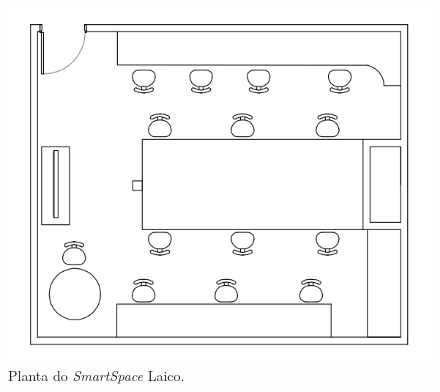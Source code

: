 	\begin{figure}[hbt]
			\begin{center}
				\includegraphics[scale=0.6]{figuras/4.ProblemaEProposta/laico.png}
			\end{center}
			\caption{Planta do \textit{SmartSpace} Laico.}
			\label{fig:laico}
		\end{figure}	
















